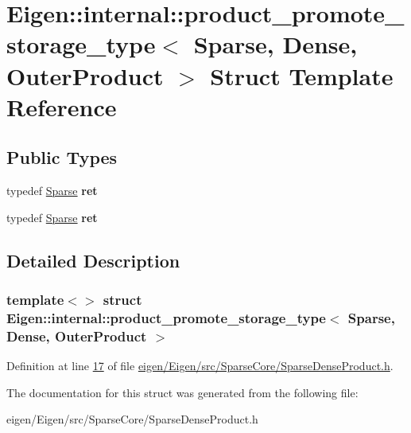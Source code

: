 \hypertarget{struct_eigen_1_1internal_1_1product__promote__storage__type_3_01_sparse_00_01_dense_00_01_outer_product_01_4}{}\section{Eigen\+:\+:internal\+:\+:product\+\_\+promote\+\_\+storage\+\_\+type$<$ Sparse, Dense, Outer\+Product $>$ Struct Template Reference}
\label{struct_eigen_1_1internal_1_1product__promote__storage__type_3_01_sparse_00_01_dense_00_01_outer_product_01_4}
\subsection*{Public Types}
\begin{DoxyCompactItemize}
\item 
\mbox{\label{struct_eigen_1_1internal_1_1product__promote__storage__type_3_01_sparse_00_01_dense_00_01_outer_product_01_4_a6875ca9f7b5e55de729c2c6bc662704c}} 
typedef \hyperlink{struct_eigen_1_1_sparse}{Sparse} {\bfseries ret}
\item 
\mbox{\label{struct_eigen_1_1internal_1_1product__promote__storage__type_3_01_sparse_00_01_dense_00_01_outer_product_01_4_a6875ca9f7b5e55de729c2c6bc662704c}} 
typedef \hyperlink{struct_eigen_1_1_sparse}{Sparse} {\bfseries ret}
\end{DoxyCompactItemize}


\subsection{Detailed Description}
\subsubsection*{template$<$$>$\newline
struct Eigen\+::internal\+::product\+\_\+promote\+\_\+storage\+\_\+type$<$ Sparse, Dense, Outer\+Product $>$}



Definition at line \hyperlink{eigen_2_eigen_2src_2_sparse_core_2_sparse_dense_product_8h_source_l00017}{17} of file \hyperlink{eigen_2_eigen_2src_2_sparse_core_2_sparse_dense_product_8h_source}{eigen/\+Eigen/src/\+Sparse\+Core/\+Sparse\+Dense\+Product.\+h}.



The documentation for this struct was generated from the following file\+:\begin{DoxyCompactItemize}
\item 
eigen/\+Eigen/src/\+Sparse\+Core/\+Sparse\+Dense\+Product.\+h\end{DoxyCompactItemize}
